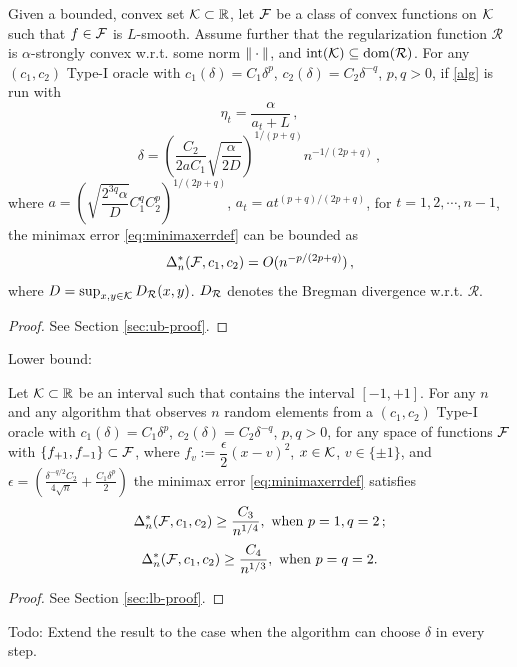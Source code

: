 \begin{theorem}
\label{thm:ub}
Given a bounded, convex set $\mathcal{K} \subset \mathbb{R}$,
let $\mathcal{F}$ be a class of convex functions on $\mathcal{K}$ such that $f \in \mathcal{F}$ is $L$-smooth.
Assume further that the regularization function $\mathcal{R}$ is $\alpha$-strongly convex w.r.t. some norm $\|\cdot\|$, and $\operatorname{int}(\mathcal{K})\subseteq \operatorname{dom}(\mathcal{R})$.
For any $(c_1,c_2)$ Type-I oracle 
 with $c_1(\delta) = C_1 \delta^p$, $c_2(\delta) = C_2 \delta^{-q}$, $p,q>0$, 
 if \cref{alg} is run with 
 \[
 \eta_t = \dfrac{\alpha}{a_t+L} \,,
 \]
 \[
 \delta = \left( \dfrac{C_2}{2aC_1}\sqrt{\dfrac{\alpha}{2D}} \right)^{1/(p+q)}n^{-1/(2p+q)} \,,
 \]
 where
 $a = \left( \sqrt{\dfrac{2^{3q}\alpha}{D}}C_1^q C_2^p \right)^{1/(2p+q)}$,
 $a_t = a t^{(p+q)/(2p+q)}$, for $t=1, 2, \cdots, n-1$,
  the minimax error \eqref{eq:minimaxerrdef} can be bounded as
 \begin{align*}
\Delta_n^*(\mathcal{F},c_1,c_2)= O(n^{-p/(2p+q)})\,,
 \end{align*}
 where $D=\sup_{x,y\in \mathcal{K}} D_{\mathcal{R}}(x,y)$. $D_{\mathcal{R}}$ denotes the Bregman divergence w.r.t. $\mathcal{R}$.
\end{theorem}
\begin{proof}
See Section \ref{sec:ub-proof}.
\end{proof}


Lower bound:
\begin{theorem}
Let $\mathcal{K}\subset \mathbb{R}$ be an interval such that contains the interval $[-1,+1]$.
 For any $n$ and any algorithm that observes $n$ random elements from a $(c_1,c_2)$ Type-I oracle 
 with $c_1(\delta) = C_1 \delta^p$, $c_2(\delta) = C_2 \delta^{-q}$, $p,q>0$,
 for any space of functions $\mathcal{F}$ with $\{f_{+1}, f_{-1} \}\subset \mathcal{F}$, 
 where $f_v:= \dfrac{\epsilon}{2} (x - v)^2$, $x\in \mathcal{K}$, $v\in \{\pm 1\}$,
and $\epsilon = \left(\frac{\delta^{-q/2}C_2}{4\sqrt{n}} + \frac{C_1\delta^p}{2}\right)$ 
 the minimax error \eqref{eq:minimaxerrdef} satisfies
\[
\Delta_n^*(\mathcal{F}, c_1,c_2) \ge \dfrac{C_3}{ n^{1/4}}, \text{ when } p=1, q=2\,; 
\]
 \[
 \Delta_n^*(\mathcal{F}, c_1,c_2) \ge \dfrac{C_4}{ n^{1/3}},  \text{ when } p=q=2.
 \]
\end{theorem}
\begin{proof}
 See Section \ref{sec:lb-proof}.
\end{proof}
Todo: Extend the result to the case when the algorithm can choose $\delta$ in every step.

